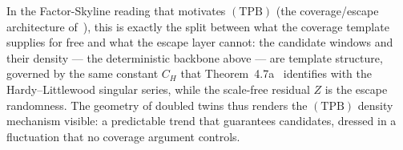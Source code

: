 In the Factor-Skyline reading that motivates $(\mathrm{TPB})$ (the
coverage/escape architecture of~\cite{FS1}), this is exactly the split between
what the coverage template supplies for free and what the escape layer cannot:
the
candidate windows and their density --- the deterministic backbone above ---
are template structure, governed by the same constant $C_H$ that
Theorem~4.7a~\cite{FS1} identifies with the Hardy--Littlewood singular series,
while the scale-free residual $Z$ is the escape randomness. The geometry of
doubled twins thus renders the $(\mathrm{TPB})$ density mechanism visible: a
predictable trend that guarantees candidates, dressed in a fluctuation that no
coverage argument controls.
